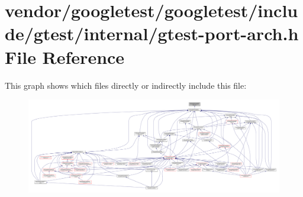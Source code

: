 \hypertarget{gtest-port-arch_8h}{}\section{vendor/googletest/googletest/include/gtest/internal/gtest-\/port-\/arch.h File Reference}
\label{gtest-port-arch_8h}
This graph shows which files directly or indirectly include this file\+:
\nopagebreak
\begin{figure}[H]
\begin{center}
\leavevmode
\includegraphics[width=350pt]{gtest-port-arch_8h__dep__incl}
\end{center}
\end{figure}

